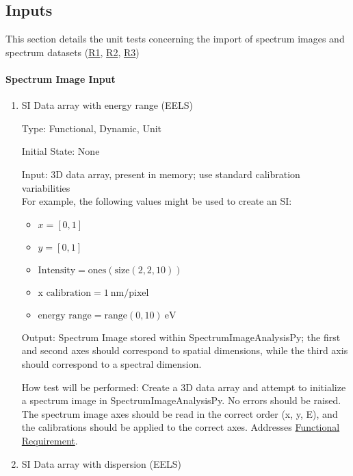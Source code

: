\documentclass[12pt, titlepage]{article}
\newcommand{\progname}{SpectrumImageAnalysisPy}
\begin{document}
\subsection{Inputs}
This section details the unit tests concerning the import of spectrum
images and spectrum datasets (\hyperref[R_SI_inputs]{R1},
\hyperref[R_spectrum_inputs]{R2}, \hyperref[R_Input_dimension]{R3})

\paragraph{Spectrum Image Input}

\begin{enumerate}

\item{SI Data array with energy range (EELS)}

Type: Functional, Dynamic, Unit

Initial State: None

Input: 3D data array, present in memory; use standard calibration
variabilities\\
For example, the following values might be used to create an SI: 
\begin{itemize}
	\item $x = [0, 1]$
	\item $y = [0, 1]$
	\item $\text{Intensity} = \text{ones}(\text{size}(2,2,10))$
	\item $\text{x calibration} = 1\ \si{\nano\metre}/\text{pixel}$
	\item $\text{energy range} = \text{range}(0, 10)\ \si{\electronvolt}$
\end{itemize}

Output: Spectrum Image stored within \progname{}; the first and second axes
should correspond to spatial dimensions, while the third axis should correspond
to a spectral dimension.

How test will be performed: Create a 3D data array and attempt to initialize a
spectrum image in \progname{}. No errors should be raised. The spectrum image
axes should be read in the correct order (x, y, E), and the calibrations should
be applied to the correct axes. Addresses \hyperref[R_SI_inputs]{Functional
Requirement}.


\item{SI Data array with dispersion (EELS)}


\end{enumerate}
\end{document}
